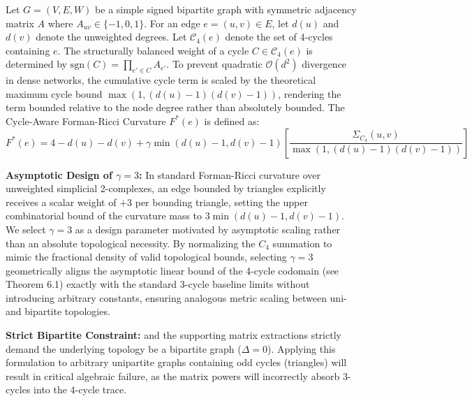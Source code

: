 \documentclass{siuro250211}
\begin{document}
\begin{definition}
\label{def:curvature}
Let $G = (V, E, W)$ be a simple signed bipartite graph with symmetric adjacency matrix $A$ where $A_{uv} \in \{-1, 0, 1\}$. For an edge $e = (u, v) \in E$, let $d(u)$ and $d(v)$ denote the unweighted degrees. Let $\mathcal{C}_4(e)$ denote the set of 4-cycles containing $e$. The structurally balanced weight of a cycle $C \in \mathcal{C}_4(e)$ is determined by $\text{sgn}(C) = \prod_{e' \in C} A_{e'}$. To prevent quadratic $\mathcal{O}(d^2)$ divergence in dense networks, the cumulative cycle term is scaled by the theoretical maximum cycle bound $\max(1, (d(u)-1)(d(v)-1))$, rendering the term bounded relative to the node degree rather than absolutely bounded. The Cycle-Aware Forman-Ricci Curvature $F^*(e)$ is defined as:
\begin{equation}
\label{eq:fstar}
F^*(e) = 4 - d(u) - d(v) + \gamma \min(d(u)-1, d(v)-1) \left[ \frac{\Sigma_{C_4}(u,v)}{\max(1, (d(u)-1)(d(v)-1))} \right]
\end{equation}

\vspace{0.5em}
\noindent \textbf{Asymptotic Design of $\gamma = 3$:} In standard Forman-Ricci curvature over unweighted simplicial 2-complexes, an edge bounded by triangles explicitly receives a scalar weight of $+3$ per bounding triangle, setting the upper combinatorial bound of the curvature mass to $3 \min(d(u)-1, d(v)-1)$. We select $\gamma=3$ as a design parameter motivated by asymptotic scaling rather than an absolute topological necessity. By normalizing the $C_4$ summation to mimic the fractional density of valid topological bounds, selecting $\gamma=3$ geometrically aligns the asymptotic linear bound of the 4-cycle codomain (see Theorem 6.1) exactly with the standard 3-cycle baseline limits without introducing arbitrary constants, ensuring analogous metric scaling between uni- and bipartite topologies.

\vspace{0.5em}
\noindent \textbf{Strict Bipartite Constraint:}  and the supporting matrix extractions strictly demand the underlying topology be a bipartite graph ($\Delta = 0$). Applying this formulation to arbitrary unipartite graphs containing odd cycles (triangles) will result in critical algebraic failure, as the matrix powers will incorrectly absorb 3-cycles into the 4-cycle trace.

\end{definition}
\end{document}
